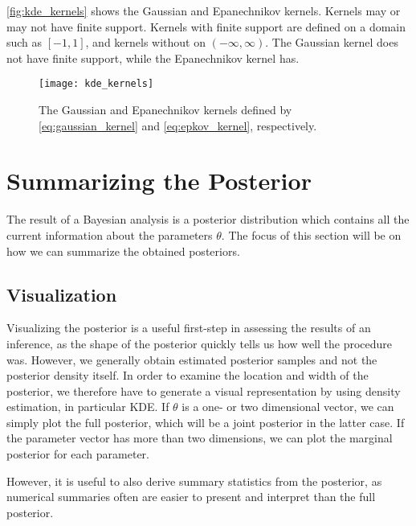 \autoref{fig:kde_kernels} shows the Gaussian and Epanechnikov kernels. Kernels may or may not have finite support. Kernels with finite support are defined on a domain such as $[-1, 1]$, and kernels without on $(-\infty, \infty)$. The Gaussian kernel does not have finite support, while the Epanechnikov kernel has. 

\begin{figure}[!htb]
    \centering
    \texttt{[image: kde\_kernels]}
    \caption{The Gaussian and Epanechnikov kernels defined by \autoref{eq:gaussian_kernel} and \autoref{eq:epkov_kernel}, respectively.
    }
    \label{fig:kde_kernels}
\end{figure}

\section{Summarizing the Posterior}\label{sec:summarize_posterior}

The result of a Bayesian analysis is a posterior distribution which contains all the current information about the parameters $\theta$. The focus of this section will be on how we can summarize the obtained posteriors.%


\subsection{Visualization} 

Visualizing the posterior is a useful first-step in assessing the results of an inference, as the shape of the posterior quickly tells us how well the procedure was. However, we generally obtain estimated posterior samples and not the posterior density itself. In order to examine the location and width of the posterior, we therefore have to generate a visual representation by using density estimation, in particular KDE. If $\theta$ is a one- or two dimensional vector, we can simply plot the full posterior, which will be a joint posterior in the latter case. If the parameter vector has more than two dimensions, we can plot the marginal posterior for each parameter.

However, it is useful to also derive summary statistics from the posterior, as numerical summaries often are easier to present and interpret than the full posterior. 

